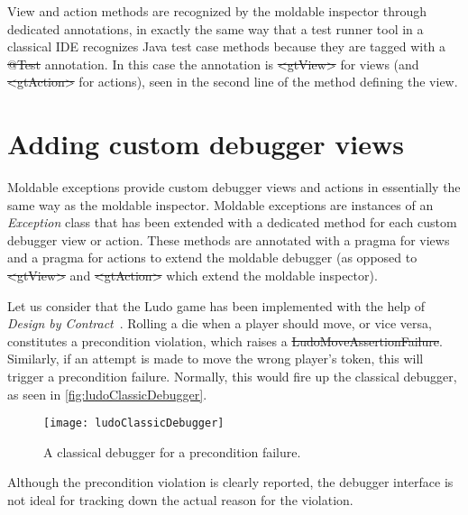 \documentclass[sigplan,10pt]{acmart}
\newcommand\on[1]{\nbc{ON}{#1}{olive}} %
\newcommand\ac[1]{\nbc{AC}{#1}{teal}}
\begin{document}

View and action methods are recognized by the moldable inspector through dedicated annotations, in exactly the same way that a test runner tool in a classical IDE recognizes Java test case methods because they are tagged with a \st{@Test} annotation.
In this case the annotation is \st{<gtView>} for views (and \st{<gtAction>} for actions), seen in the second line of the method defining the view.

\section{Adding custom debugger views}\label{sec:views}

Moldable exceptions provide custom debugger views and actions in essentially the same way as the moldable inspector.
Moldable exceptions are instances of an \emph{Exception} class that has been extended with a dedicated method for each custom debugger view or action.
These methods are annotated with a  pragma for views and a  pragma for actions to extend the moldable debugger
(\ie as opposed to \st{<gtView>} and  \st{<gtAction>} which extend the moldable inspector).


Let us consider that the Ludo game has been implemented with the help of \emph{Design by Contract}~\cite{Meye92b}.
Rolling a die when a player should move, or vice versa, constitutes a precondition violation, which raises a \st{LudoMoveAssertionFailure}.
Similarly, if an attempt is made to move the wrong player's token, this will trigger a precondition failure.
Normally, this would fire up the classical debugger, as seen in \autoref{fig:ludoClassicDebugger}.
\begin{figure}[h]
  \texttt{[image: ludoClassicDebugger]}
  \caption{A classical debugger for a precondition failure.}
  \label{fig:ludoClassicDebugger}
\end{figure}
Although the precondition violation is clearly reported, the debugger interface is not ideal for tracking down the actual reason for the violation.
\end{document}
